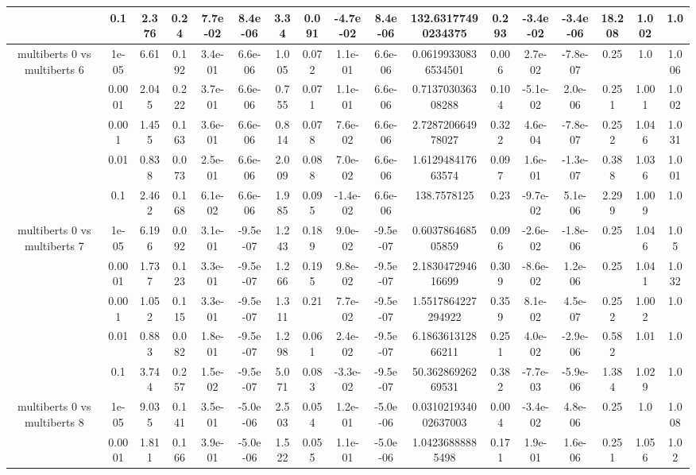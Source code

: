 \begin{tabular}{|c|c|c|c|c|c|c|c|c|c|c|c|c|c|c|c|c|}
 & 0.1 & 2.376 & 0.24 & 7.7e-02 & 8.4e-06 & 3.34 & 0.091 & -4.7e-02 & 8.4e-06 & 132.63177490234375 & 0.293 & -3.4e-02 & -3.4e-06 & 18.208 & 1.002 & 1.0 \\
\hline
\multirow{5}{*}{multiberts 0 vs multiberts 6} & 1e-05 & 6.61 & 0.192 & 3.4e-01 & 6.6e-06 & 1.005 & 0.072 & 1.1e-01 & 6.6e-06 & 0.06199330836534501 & 0.006 & 2.7e-02 & -7.8e-07 & 0.25 & 1.0 & 1.006 \\
 & 0.0001 & 2.045 & 0.222 & 3.7e-01 & 6.6e-06 & 0.755 & 0.071 & 1.1e-01 & 6.6e-06 & 0.713703036308288 & 0.104 & -5.1e-02 & 2.0e-06 & 0.251 & 1.001 & 1.002 \\
 & 0.001 & 1.455 & 0.163 & 3.6e-01 & 6.6e-06 & 0.814 & 0.078 & 7.6e-02 & 6.6e-06 & 2.728720664978027 & 0.322 & 4.6e-04 & -7.8e-07 & 0.252 & 1.046 & 1.031 \\
 & 0.01 & 0.838 & 0.073 & 2.5e-01 & 6.6e-06 & 2.009 & 0.088 & 7.0e-02 & 6.6e-06 & 1.612948417663574 & 0.097 & 1.6e-01 & -1.3e-07 & 0.388 & 1.036 & 1.001 \\
 & 0.1 & 2.462 & 0.168 & 6.1e-02 & 6.6e-06 & 1.985 & 0.095 & -1.4e-02 & 6.6e-06 & 138.7578125 & 0.23 & -9.7e-02 & 5.1e-06 & 2.299 & 1.009 & 1.0 \\
\hline
\multirow{5}{*}{multiberts 0 vs multiberts 7} & 1e-05 & 6.196 & 0.092 & 3.1e-01 & -9.5e-07 & 1.243 & 0.189 & 9.0e-02 & -9.5e-07 & 0.603786468505859 & 0.096 & -2.6e-02 & -1.8e-06 & 0.25 & 1.046 & 1.05 \\
 & 0.0001 & 1.737 & 0.123 & 3.3e-01 & -9.5e-07 & 1.266 & 0.195 & 9.8e-02 & -9.5e-07 & 2.183047294616699 & 0.309 & -8.6e-02 & 1.2e-06 & 0.25 & 1.041 & 1.032 \\
 & 0.001 & 1.052 & 0.115 & 3.3e-01 & -9.5e-07 & 1.311 & 0.21 & 7.7e-02 & -9.5e-07 & 1.5517864227294922 & 0.359 & 8.1e-02 & 4.5e-07 & 0.252 & 1.002 & 1.0 \\
 & 0.01 & 0.883 & 0.082 & 1.8e-01 & -9.5e-07 & 1.298 & 0.061 & 2.4e-02 & -9.5e-07 & 6.186361312866211 & 0.251 & 4.0e-02 & -2.9e-06 & 0.582 & 1.01 & 1.0 \\
 & 0.1 & 3.744 & 0.257 & 1.5e-02 & -9.5e-07 & 5.071 & 0.083 & -3.3e-02 & -9.5e-07 & 50.36286926269531 & 0.382 & -7.7e-03 & -5.9e-06 & 1.384 & 1.029 & 1.0 \\
\hline
\multirow{5}{*}{multiberts 0 vs multiberts 8} & 1e-05 & 9.035 & 0.141 & 3.5e-01 & -5.0e-06 & 2.503 & 0.054 & 1.2e-01 & -5.0e-06 & 0.031021934002637003 & 0.004 & -3.4e-02 & 4.8e-06 & 0.25 & 1.0 & 1.008 \\
 & 0.0001 & 1.811 & 0.166 & 3.9e-01 & -5.0e-06 & 1.522 & 0.055 & 1.1e-01 & -5.0e-06 & 1.04236888885498 & 0.171 & 1.9e-01 & 1.6e-06 & 0.251 & 1.056 & 1.02 \\

\end{tabular}
